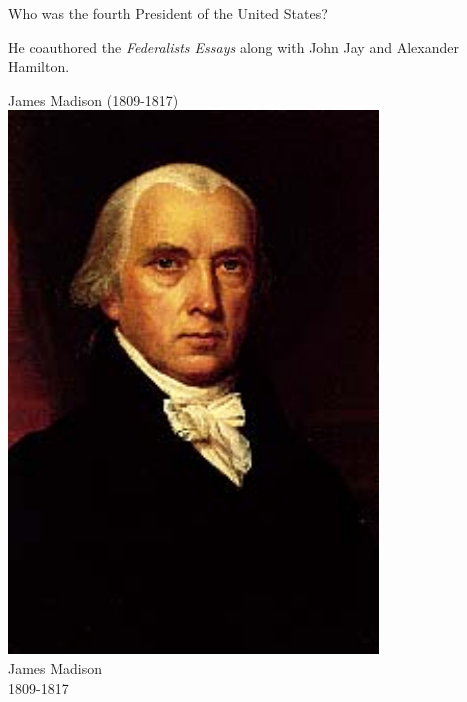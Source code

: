 \documentclass{article}
\def\rescale{.4} %
\begin{document}
\begin{card}
    \raggedright Who was the fourth President of the United States? \ifecListing\newline\fi
    \begin{fillIn}
    \end{fillIn}
    \begin{response}
        \begin{hint}\raggedright
            He coauthored the \textsl{Federalists Essays} along with
            John Jay and Alexander Hamilton.
        \begin{fillIn}
        \end{fillIn}
        \end{hint}
        \begin{answer}
        \ifecListing
            James Madison (1809-1817)
        \else\centering
            \includegraphics[scale=\rescale]{presidents/jm4}\\
            James Madison\\
            1809-1817
        \fi
        \end{answer}
    \end{response}
\end{card}
\end{document}
